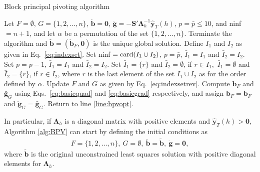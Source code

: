 \documentclass[11pt]{article}
\newcommand{\0}{\phantom{0}}
\begin{document}
\begin{algorithm}
	\caption{Block principal pivoting algorithm}
	\label{alg:BPV}
	\begin{spacing}{1.3}
		\begin{algorithmic}[1]
			\Require Let $F = \emptyset$, $G = \{1, 2, \dots, n\}$, $\ddot{\bm{b}} = \bm{0}$, $\ddot{\bm{g}} = -\bm{S}'\bm{\Lambda}_{h}^{-1}\hat{\bm{y}}_{T}(h)$, $p = \bar{p} \leq 10$, and ninf $= n + 1$, and let $\alpha$ be a permutation of the set $\{1, 2, \dots, n\}$.
			 \label{line:bpvopt}
			\State Terminate the algorithm and $\breve{\bm{b}} = (\ddot{\bm{b}}_{F}, \bm{0})$ is the unique global solution.
			\Else{}
			\State Define $I_{1}$ and $I_{2}$ as given in Eq.\ \eqref{eq:indexset}.
			\State Set ninf $= \textnormal{card}(I_{1} \cup I_{2})$, $p = \bar{p}$, $\bar{I}_{1} = I_{1}$ and $\bar{I}_{2} = I_{2}$.
			\State Set $p = p - 1$, $\bar{I}_{1} = I_{1}$ and $\bar{I}_{2} = I_{2}$.
			\State Set $\bar{I}_{1} = \{r\}$ and $\bar{I}_{2} = \emptyset$, if $r \in I_{1},$
			\State \hspace{5.3mm} $\bar{I}_{1} = \emptyset $ and $\bar{I}_{2} = \{r\}$, if $r \in I_{2}$,
			\State where $r$ is the last element of the set $I_{1} \cup I_{2}$ as for the order defined by $\alpha$.
			\EndIf
			\State Update $F$ and $G$ as given by Eq.\ \eqref{eq:indexsetrev}.
			\State Compute $\bar{\bm{b}}_{F}$ and $\bar{\bm{g}}_{G}$ using Eqs.\ \eqref{eq:basicquad} and \eqref{eq:basicgrad} respectively, and assign $\ddot{\bm{b}}_{F} = \bar{\bm{b}}_{F}$ and $\ddot{\bm{g}}_{G} = \bar{\bm{g}}_{G}$.
			\State Return to line \ref{line:bpvopt}.
			\EndIf
		\end{algorithmic}
	\end{spacing}
\end{algorithm}


In particular, if $\bm{\Lambda}_{h}$ is a diagonal matrix with positive elements and $\hat{\bm{y}}_{T}(h) > \bm{0}$, Algorithm \ref{alg:BPV} can start by defining the initial conditions as
\begin{align*}
F = \{1, 2, \dots, n\},\ G = \emptyset,\ \ddot{\bm{b}} = \tilde{\bm{b}},\ \ddot{\bm{g}} = \bm{0}, 
\end{align*} 
where $\tilde{\bm{b}}$ is the original unconstrained least squares solution with positive diagonal elements for $\bm{\Lambda}_{h}$. 
\end{document}
